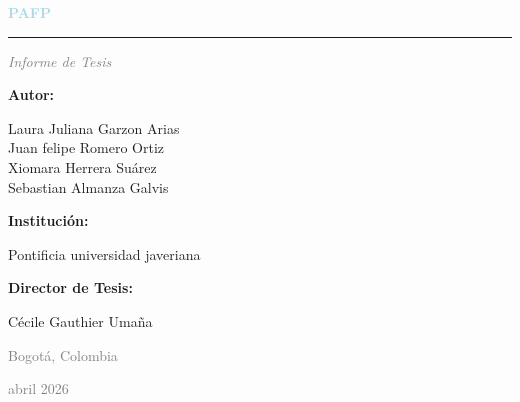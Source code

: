 \documentclass[12pt]{article}
\begin{document}
\vspace*{0.5cm}
\begin{center}
    \textcolor{lightblue}{\textbf{\fontsize{26}{31}\selectfont PAFP}}
\end{center}
\vspace{0.8cm}
\begin{center}
    \textcolor{lightblue}{\rule{6cm}{2pt}}
\end{center}
\vspace{1cm}
\begin{center}
    \textit{\fontsize{16}{19}\selectfont \textcolor{gray}{Informe de Tesis}}
\end{center}
\vspace{1cm}
\begin{center}
    \textbf{\fontsize{12}{14}\selectfont Autor:}
\end{center}
\begin{center}
    \fontsize{12}{14}\selectfont Laura Juliana Garzon Arias\\[2pt]
    \fontsize{12}{14}\selectfont Juan felipe Romero Ortiz\\[2pt]
    \fontsize{12}{14}\selectfont Xiomara Herrera Suárez\\[2pt]
    \fontsize{12}{14}\selectfont Sebastian Almanza Galvis
\end{center}
\vspace{0.8cm}
\begin{center}
    \textbf{\fontsize{12}{14}\selectfont Institución:}
\end{center}
\begin{center}
    \fontsize{12}{14}\selectfont Pontificia universidad javeriana
\end{center}
\vspace{0.8cm}
\begin{center}
    \textbf{\fontsize{12}{14}\selectfont Director de Tesis:}
\end{center}
\begin{center}
    \fontsize{12}{14}\selectfont Cécile Gauthier Umaña
\end{center}
\vspace{1.5cm}
\begin{center}
    \textcolor{gray}{\fontsize{12}{14}\selectfont Bogotá, Colombia}
\end{center}
\begin{center}
    \textcolor{gray}{\fontsize{12}{14}\selectfont abril 2026 }
\end{center}

\newpage
\end{document}
